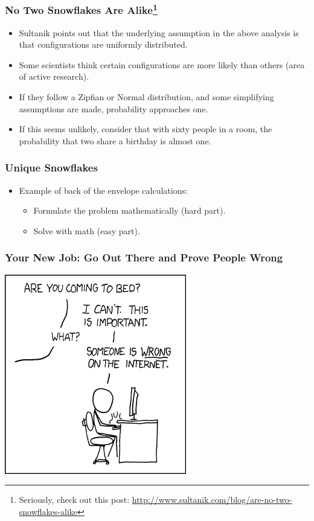\documentclass{beamer}
\begin{document}
\begin{frame}
\frametitle{No Two Snowflakes Are
    Alike\footnote{Seriously, check out this post:  \url{http://www.sultanik.com/blog/are-no-two-snowflakes-alike}}}
\begin{itemize}
    \item Sultanik points out that the underlying assumption in the above
        analysis is that configurations are uniformly distributed.
    \item Some scientists think certain configurations are more likely than
        others (area of active research).
    \item If they follow a Zipfian or Normal distribution, and some simplifying
        assumptions are made, probability approaches one.
    \item If this seems unlikely, consider that with sixty people in a room, the
        probability that two share a birthday is almost one.
\end{itemize}
\end{frame}


\begin{frame}
\frametitle{Unique Snowflakes}
\begin{itemize}
    \item Example of back of the envelope calculations:
    \begin{itemize}
        \item Formulate the problem mathematically (hard part).
        \item Solve with math (easy part).
    \end{itemize}
\end{itemize}
\end{frame}



\begin{frame}
\frametitle{Your New Job:  Go Out There and Prove People Wrong}
\begin{center}
\includegraphics[height=0.8\vsize]{art/duty_calls.png}
\end{center}
\end{frame}
\end{document}
